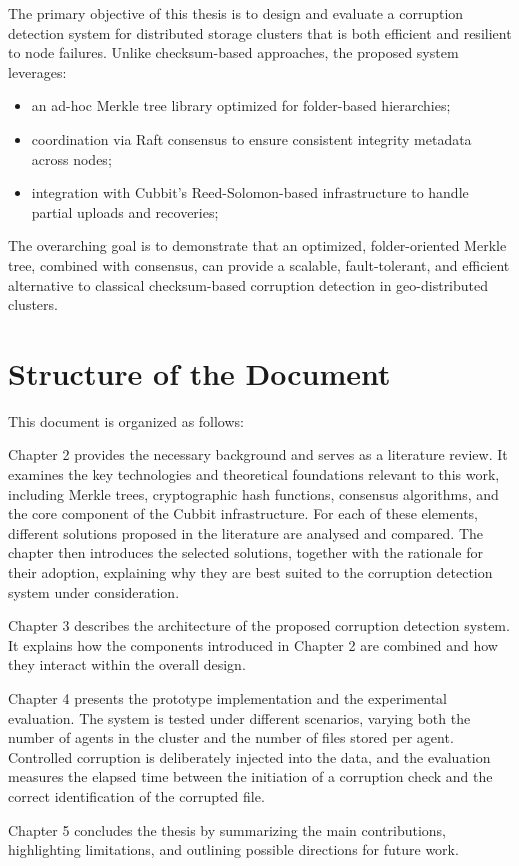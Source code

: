 The primary objective of this thesis is to design and evaluate a corruption detection system for distributed storage clusters that is both efficient and resilient to node failures. Unlike checksum-based approaches, the proposed system leverages:  
\begin{itemize}
    \item an ad-hoc Merkle tree library optimized for folder-based hierarchies;  
    \item coordination via Raft consensus to ensure consistent integrity metadata across nodes;  
    \item integration with Cubbit's Reed-Solomon-based infrastructure to handle partial uploads and recoveries;  
\end{itemize}

The overarching goal is to demonstrate that an optimized, folder-oriented Merkle tree, combined with consensus, can provide a scalable, fault-tolerant, and efficient alternative to classical checksum-based corruption detection in geo-distributed clusters.


\section{Structure of the Document}

This document is organized as follows:

Chapter 2 provides the necessary background and serves as a literature review. It examines the key technologies and theoretical foundations relevant to this work, including Merkle trees, cryptographic hash functions, consensus algorithms, and the core component of the Cubbit infrastructure. For each of these elements, different solutions proposed in the literature are analysed and compared. The chapter then introduces the selected solutions, together with the rationale for their adoption, explaining why they are best suited to the corruption detection system under consideration.
    
Chapter 3 describes the architecture of the proposed corruption detection system. It explains how the components introduced in Chapter 2 are combined and how they interact within the overall design.

Chapter 4 presents the prototype implementation and the experimental evaluation. The system is tested under different scenarios, varying both the number of agents in the cluster and the number of files stored per agent. Controlled corruption is deliberately injected into the data, and the evaluation measures the elapsed time between the initiation of a corruption check and the correct identification of the corrupted file.

Chapter 5 concludes the thesis by summarizing the main contributions, highlighting limitations, and outlining possible directions for future work.